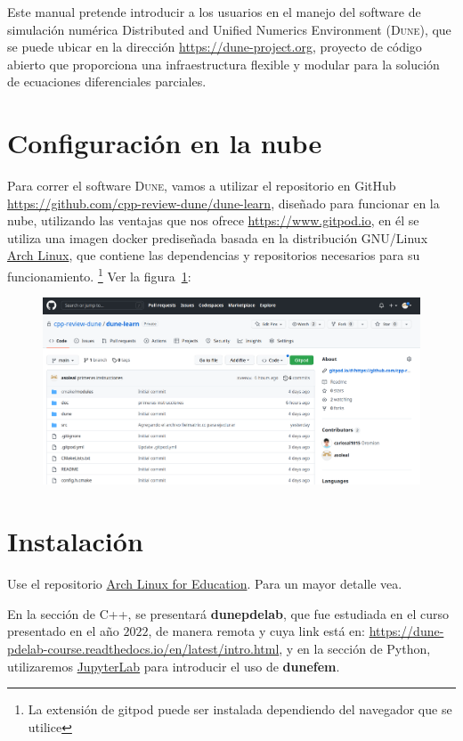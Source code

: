 Este manual pretende introducir a los usuarios en el manejo del
software de simulación numérica Distributed and Unified Numerics
Environment (\textsc{Dune}), que se puede ubicar en la dirección
\url{https://dune-project.org}, proyecto de código abierto que
proporciona una infraestructura flexible y modular para la solución
de ecuaciones diferenciales parciales.

\section{Configuración en la nube}

Para correr el software \textsc{Dune}, vamos a utilizar el
repositorio en GitHub
\url{https://github.com/cpp-review-dune/dune-learn},
diseñado para funcionar en la nube, utilizando las ventajas que nos
ofrece \url{https://www.gitpod.io}, en él se utiliza una imagen
docker prediseñada basada en la distribución GNU/Linux
\href{https://archlinux.org}{Arch Linux}, que contiene las
dependencias y repositorios necesarios para su funcionamiento.
\footnote{
	La extensión de gitpod puede ser instalada dependiendo del
	navegador que se utilice
}
Ver la figura~\ref{fig:github01}:

\begin{figure}[ht!]
	\centering
	\includegraphics[scale=0.3,keepaspectratio]{cppreview-learn.png}
	\label{fig:github01}
\end{figure}

\section{Instalación}

Use el repositorio
\href{https://wiki.archlinux.org/title/Unofficial_user_repositories_(Espa%C3%B1ol)#arch4edu}{Arch Linux for Education}.
Para un mayor detalle vea.

En la sección de C++, se presentará \textbf{dunepdelab}, que fue
estudiada en el curso presentado en el año $2022$, de manera remota y
cuya link está en:
\url{https://dune-pdelab-course.readthedocs.io/en/latest/intro.html},
y en la sección de Python, utilizaremos
\href{https://jupyter.org}{JupyterLab} para introducir el uso de \textbf{dunefem}.